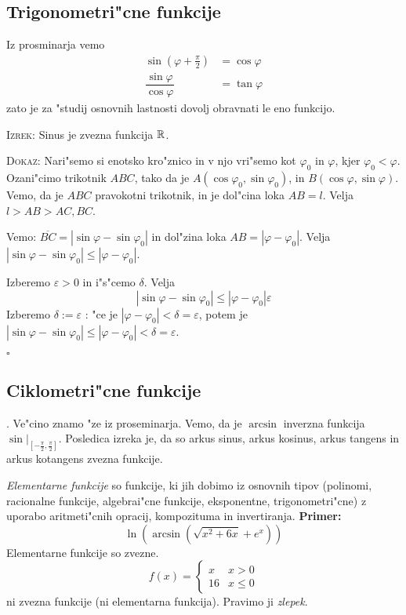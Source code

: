 \subsection{Trigonometri"cne funkcije}
Iz prosminarja vemo
\begin{align*}
\sin (\varphi + \frac{\pi}{2}) &= \cos \varphi \\
\dfrac{\sin \varphi}{\cos\varphi} &= \tan \varphi
\end{align*}
zato je za "studij osnovnih lastnosti dovolj obravnati le eno funkcijo.

\textsc{Izrek:} Sinus je zvezna funkcija $\mathbb{R}$.

\textsc{Dokaz:} Nari"semo si enotsko kro"znico in v njo vri"semo kot $\varphi_0$ in $\varphi$, kjer $\varphi_0 < \varphi$. Ozani"cimo trikotnik $ABC$, tako da je $A(\cos \varphi_0, \sin \varphi_0)$, in $B(\cos\varphi, \sin\varphi)$. Vemo, da je $ABC$ pravokotni trikotnik, in je dol"cina loka $AB = l$. Velja $l > AB > AC, BC$.

Vemo: $\overline{BC} = |\sin \varphi - \sin \varphi_0|$ in dol"zina loka $AB = |\varphi - \varphi_0|$. Velja $|\sin \varphi - \sin \varphi_0| \leq |\varphi - \varphi_0|$.


Izberemo $\varepsilon > 0$ in i"s"cemo $\delta$. Velja
\begin{equation*}
|\sin\varphi - \sin \varphi_0| \leq |\varphi - \varphi_0|  \varepsilon
\end{equation*}
Izberemo $\delta := \varepsilon$ : "ce je $|\varphi - \varphi_0| < \delta = \varepsilon$, potem je $|\sin\varphi - \sin \varphi_0| \leq |\varphi-\varphi_0| < \delta = \varepsilon$.

\hfill $\square$
%
\subsection{Ciklometri"cne funkcije}.
Ve"cino znamo "ze iz proseminarja. Vemo, da je $\arcsin$ inverzna funkcija $\sin|_{[- \frac{\pi}{2}, \frac{\pi}{2}]}$. Posledica izreka je, da so arkus sinus, arkus kosinus, arkus tangens in arkus kotangens zvezna funkcije.

\emph{Elementarne funkcije} so funkcije, ki jih dobimo iz osnovnih tipov (polinomi, racionalne funkcije, algebrai"cne funkcije, eksponentne, trigonometri"cne) z uporabo aritmeti"cnih opracij, kompozituma in invertiranja. \textbf{Primer:}
\begin{equation*}
\ln (\arcsin ( \sqrt{x^2 + 6x} + e^x))
\end{equation*}
Elementarne funkcije so zvezne.
\begin{equation*}
f(x) = \begin{cases}
x & x > 0 \\
16 & x \leq 0
\end{cases}
\end{equation*}
ni zvezna funkcije (ni elementarna funkcija). Pravimo ji \emph{zlepek}.
%
